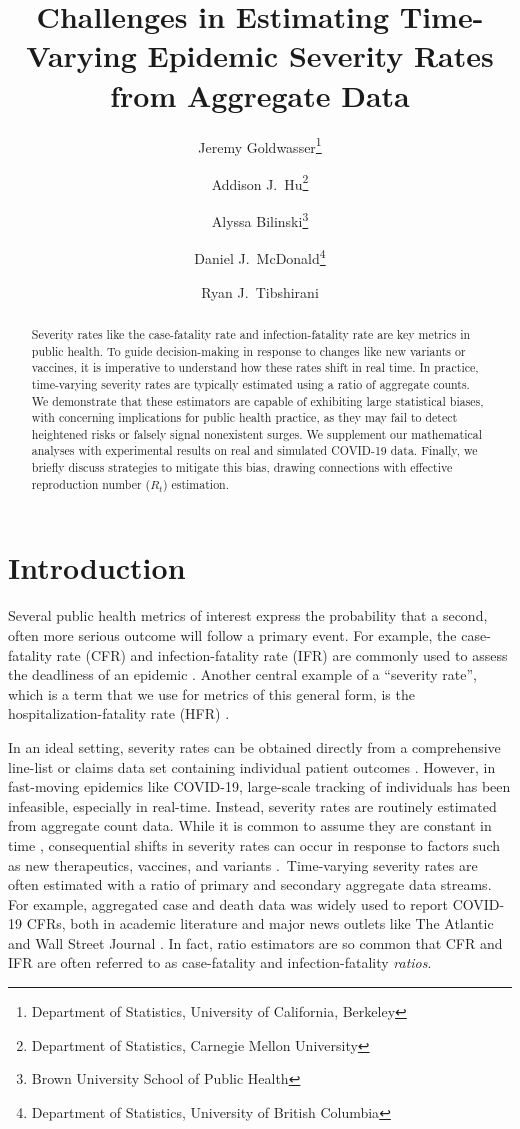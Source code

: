 \documentclass{article}
\title{Challenges in Estimating Time-Varying Epidemic Severity Rates from
  Aggregate Data}
\author{Jeremy Goldwasser\thanks{Department of Statistics, University of
    California, Berkeley} 
  \and  
  Addison J.\ Hu\thanks{Department of Statistics, Carnegie Mellon University}
  \and 
  Alyssa Bilinski\thanks{Brown University School of Public Health} 
  \and
  Daniel J.\ McDonald\thanks{Department of Statistics, University of British
    Columbia} 
  \and 
  Ryan J.\ Tibshirani\footnotemark[1]}
\date{}
\begin{document}
\maketitle

\begin{abstract}
Severity rates like the case-fatality rate and infection-fatality rate are
key metrics in public health. To guide decision-making in response to changes
like new variants or vaccines, it is imperative to understand how these rates
shift in real time. In practice, time-varying severity rates are typically
estimated using a ratio of aggregate counts. We demonstrate that these
estimators are capable of exhibiting large statistical biases, with concerning
implications for public health practice, as they may fail to detect heightened 
risks or falsely signal nonexistent surges. We supplement our mathematical 
analyses with experimental results on real and simulated COVID-19 data. Finally,
we briefly discuss strategies to mitigate this bias, drawing connections with
effective reproduction number ($R_t$) estimation. 
\end{abstract}
\section{Introduction}

Several public health metrics of interest express the probability that a second,
often more serious outcome will follow a primary event. For example, the
case-fatality rate (CFR) and infection-fatality rate (IFR) are commonly used to
assess the deadliness of an epidemic \citep{nishiuraEx1, nishiuraEx2,
  cfr_line_list, lancet_ifr, timevar_ifr}. Another central example of a
``severity rate'', which is a term that we use for metrics of this general form,
is the hospitalization-fatality rate (HFR) \citep{HFR_linelist3, HFR_linelist1,  
  HFR_linelist2}.

In an ideal setting, severity rates can be obtained directly from a
comprehensive line-list or claims data set containing individual patient
outcomes \citep{HFR_linelist3, HFR_linelist1, HFR_linelist2,
  cfr_line_list}. However, in fast-moving epidemics like COVID-19, large-scale 
tracking of individuals has been infeasible, especially in real-time. Instead,
severity rates are routinely estimated from aggregate count data. While it is
common to assume they are constant in time \citep{ghani, jewell2007nonparametric, 
  reich2012estimating, lancet_controversial}, consequential shifts in severity
rates can occur in response to factors such as new therapeutics, vaccines, and
variants \citep{nyt}. Time-varying severity rates are often estimated with a
ratio of primary and secondary aggregate data streams. For example, aggregated
case and death data was widely used to report COVID-19 CFRs, both in academic 
literature \citep{germany, horita2022global, timevar_ifr, yuan2020monitoring,
LIU2023100350} and major news outlets like The Atlantic \citep{atlantic} and
Wall Street Journal \citep{wsj}. In fact, ratio estimators are so common that
CFR and IFR are often referred to as case-fatality and infection-fatality
\textit{ratios}. 
\end{document}
